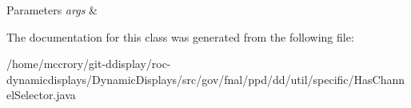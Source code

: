 \begin{DoxyParams}{Parameters}
{\em args} & \\
\hline
\end{DoxyParams}


The documentation for this class was generated from the following file\-:\begin{DoxyCompactItemize}
\item 
/home/mccrory/git-\/ddisplay/roc-\/dynamicdisplays/\-Dynamic\-Displays/src/gov/fnal/ppd/dd/util/specific/Has\-Channel\-Selector.\-java\end{DoxyCompactItemize}
